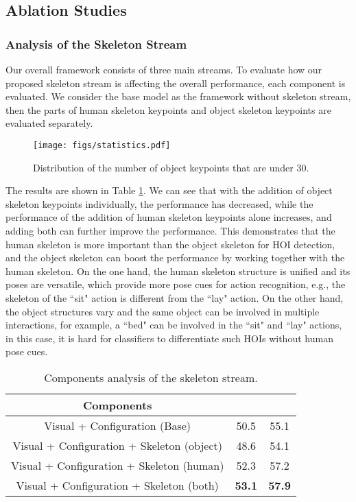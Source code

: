 \documentclass[a4paper, 10pt, conference]{IEEEtran}
\begin{document}
\subsection{Ablation Studies}


\subsubsection{Analysis of the Skeleton Stream}
Our overall framework consists of three main streams. To evaluate how our proposed skeleton stream is affecting the overall performance, each component is evaluated. We consider the base model as the framework without skeleton stream, then the parts of human skeleton keypoints and object skeleton keypoints are evaluated separately. 

\begin{figure}[htbp]
\centering
	\texttt{[image: figs/statistics.pdf]}
	\caption{\footnotesize{Distribution of the number of object keypoints that are under 30.}}
	\label{Fig: statistics}
\end{figure}

The results are shown in Table \ref{component}. We can see that with the addition of object skeleton keypoints individually, the performance has decreased, while the performance of the addition of human skeleton keypoints alone increases, and adding both can further improve the performance. This demonstrates that the human skeleton is more important than the object skeleton for HOI detection, and the object skeleton can boost the performance by working together with the human skeleton. On the one hand, the human skeleton structure is unified and its poses are versatile, which provide more pose cues for action recognition, e.g., the skeleton of the ``sit" action is different from the ``lay" action. On the other hand, the object structures vary and the same object can be involved in multiple interactions, for example, a ``bed" can be involved in the ``sit" and ``lay" actions, in this case, it is hard for classifiers to differentiate such HOIs without human pose cues.


\begin{table}[htbp]
	\centering
	\caption{Components analysis of the skeleton stream.}
	\label{component}
\begin{tabular}{|c| c| c|}\hline
		Components &  &  \\ \hline
		Visual + Configuration (Base) & 50.5 & 55.1 \\ \hline
		Visual + Configuration + Skeleton (object) & 48.6 & 54.1 \\ \hline
		Visual + Configuration + Skeleton (human) & 52.3  & 57.2 \\ \hline
		Visual + Configuration + Skeleton (both) & \textbf{53.1} & \textbf{57.9} \\ \hline
    	\end{tabular}
\end{table}
\end{document}
